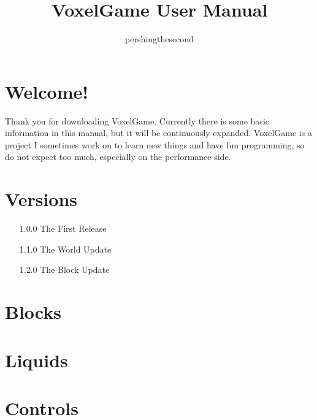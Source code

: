 \documentclass{article}
\begin{document}
    \title{VoxelGame User Manual}
    \author{pershingthesecond}

    \maketitle
    \newpage

    \tableofcontents
    \newpage


    \section{Welcome!}\label{sec:welcome!}

    Thank you for downloading VoxelGame.
    Currently there is some basic information in this manual, but it will be continuously expanded.
    VoxelGame is a project I sometimes work on to learn new things and have fun programming, so do not expect too much, especially on the performance side.


    \section{Versions}\label{sec:versions}

    \begin{enumerate}
        \item[1.0.0] The First Release
        \item[1.1.0] The World Update
        \item[1.2.0] The Block Update
    \end{enumerate}


    \section{Blocks}\label{sec:blocks}

    


    \section{Liquids}\label{sec:liquids}

    


    \section{Controls}\label{sec:controls}

    
\end{document}
